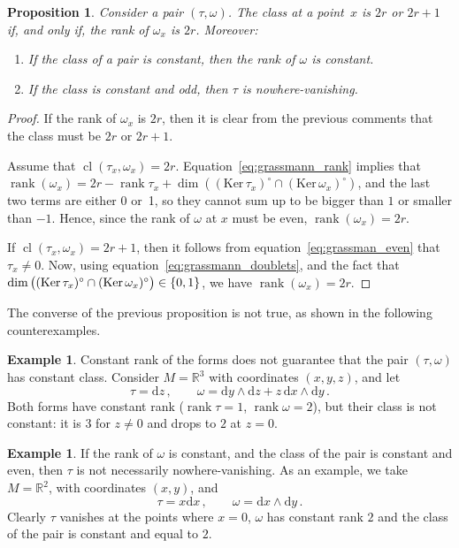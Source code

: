 \documentclass[11pt,twoside]{article}
\theoremstyle{plain}
\newtheorem{proposition}[theorem]{Proposition}
\theoremstyle{definition}
\newtheorem{example}[theorem]{Example}
\newcommand{\R}{\mathbb{R}}
\renewcommand{\d}{\mathrm{d}}
\DeclareMathOperator{\rk}{rank}
\DeclareMathOperator{\cl}{cl}
\def\d{\mathrm{d}}
\def\d{\mathrm{d}}
\def\Ker{\mathrm{Ker \,}}
\begin{document}
\begin{proposition}
\label{prop:doublet_conditions}
Consider a pair $(\tau,\omega)$.
The class at a point~$x$ is $2r$ or $2r+1$ if, and only if, the rank of $\omega_x$ is $2r$.
Moreover:
\begin{enumerate}[$(a)$]
\item 
If the class of a pair is constant, 
then the rank of $\omega$ is constant. 
\item 
If the class is constant and odd,
then $\tau$ is nowhere-vanishing.
\end{enumerate} 
    
\end{proposition}
\begin{proof}
If the rank of $ \omega_x$ is $2r$, then it is clear from the previous comments that the class must be $2r$ or $2r+1$. 

Assume that $\cl(\tau_x,\omega_x)=2r$.
Equation~\eqref{eq:grassmann_rank}
implies that $\rk(\omega_x)=2r - \rk{\tau_x} +
\dim ((\Ker \tau_x)^{\circ}\cap(\Ker \omega_x)^{\circ})$,
and the last two terms are either 0 or~1, 
so they cannot sum up to be bigger than $1$ or smaller than $-1$.
Hence, since the rank of $\omega$ at $x$ must be even, $\rk (\omega_x)= 2r$.

If $\cl(\tau_x,\omega_x)=2r+1$, then it follows from equation~\eqref{eq:grassman_even} that  $\tau_x\neq 0$. Now, using equation~\eqref{eq:grassmann_doublets}, and the fact that 
$
\dim \left( \strut
(\Ker \tau_x)^{\circ}\cap(\Ker \omega_x)^{\circ}
\right) 
\in \{0,1\}
$, we have $\rk (\omega_x)= 2r$.


\end{proof}

The converse of the previous proposition is not true, as shown in the following counterexamples.
    
\begin{example}
Constant rank of the forms does not guarantee that the pair $(\tau,\omega)$ has constant class. 
Consider $M=\mathbb{R}^3$ with coordinates $(x,y,z)$, and let
$$
    \tau = \d z\,, \qquad 
    \omega = \d y \wedge \d z + z\, \d x \wedge \d y\,.
$$
Both forms have constant rank ($\rk\tau = 1$, $\rk\omega = 2$), but their class is not constant: 
it is $3$ for $z\neq 0$ and drops to $2$ at $z=0$. 
\end{example}

\begin{example} 
If the rank of $\omega$ is constant, and the class of the pair is constant and even, then $\tau$ is not necessarily nowhere-vanishing. As an example, we take $M= \R^2$, with coordinates $(x,y)$, and
$$
    \tau = x\d x\,, \qquad 
    \omega = \d x \wedge \d y\,.
$$
Clearly $\tau$ vanishes at the points where $x=0$, $\omega$ has constant rank $2$ and the class of the pair is constant and equal to $2$.
\end{example}
\end{document}
